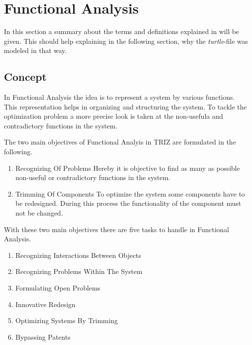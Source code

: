 \section{Functional Analysis}
\label{sec:functional_analysis}

In this section a summary about the terms and definitions explained in \cite{KS} will be given. 
This should help explaining in the following section, why the \textit{turtle}-file was modeled in that way.

\subsection{Concept}

In Functional Analysis the idea is to represent a system by various functions.
This representation helps in organizing and structuring the system.
To tackle the optimization problem a more precise look is taken at the non-usefula and contradictory functions in the system. 

The two main objectives of Functional Analyis in TRIZ are formulated in the following.

\begin{enumerate}
    \item Recognizing Of Problems \newline
        Hereby it is objective to find as many as possible non-useful or contradictory functions in the system.
    \item Trimming Of Components \newline
        To optimize the system some components have to be redesigned. 
        During this process the functionality of the component must not be changed.  
\end{enumerate}



With these two main objectives there are five tasks to handle in Functional Analysis.

\begin{enumerate}[noitemsep]
	\item Recognizing Interactions Between Objects
	\item Recognizing Problems Within The System
	\item Formulating Open Problems
	\item Innovative Redesign
	\item Optimizing Systems By Trimming
	\item Bypassing Patents
\end{enumerate}


